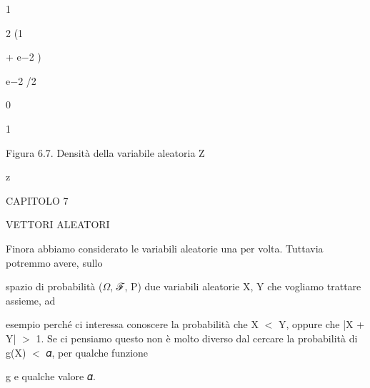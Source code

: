 \documentclass[a4paper,portrait,12pt]{article}
\begin{document}
1


2 (1





\begin{flushleft}
+ e$-$2 )
\end{flushleft}


\begin{flushleft}
e$-$2 /2
\end{flushleft}


0





1





\begin{flushleft}
Figura 6.7. Densit\`{a} della variabile aleatoria Z
\end{flushleft}





\begin{flushleft}
z
\end{flushleft}





\begin{flushleft}
\newpage
CAPITOLO 7
\end{flushleft}


\begin{flushleft}
VETTORI ALEATORI
\end{flushleft}


\begin{flushleft}
Finora abbiamo considerato le variabili aleatorie una per volta. Tuttavia potremmo avere, sullo
\end{flushleft}


\begin{flushleft}
spazio di probabilit\`{a} ($\Omega$, ℱ, P) due variabili aleatorie X, Y che vogliamo trattare assieme, ad
\end{flushleft}


\begin{flushleft}
esempio perch\'{e} ci interessa conoscere la probabilit\`{a} che X $<$ Y, oppure che |X + Y| $>$ 1. Se ci pensiamo questo non \`{e} molto diverso dal cercare la probabilit\`{a} di g(X) $<$ 𝛼, per qualche funzione
\end{flushleft}


\begin{flushleft}
g e qualche valore 𝛼.
\end{flushleft}
\end{document}
